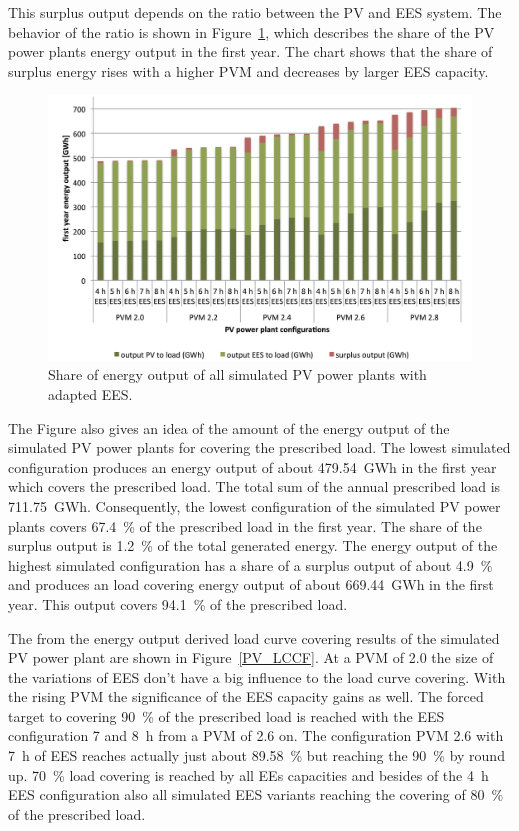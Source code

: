 This surplus output depends on the ratio between the PV and EES system. The behavior of the ratio is shown in Figure~\ref{PV_energy_output}, which describes the share of the PV power plants energy output in the first year. The chart shows that the share of surplus energy rises with a higher PVM and decreases by larger EES capacity.

\begin{figure}[htbp]  
\centering
\includegraphics[width=1\linewidth]{FIG/PV_energy_output}
\caption[Share of energy output of all simulated PV power plants with adapted EES.]{Share of energy output of all simulated PV power plants with adapted EES.}\label{PV_energy_output}
\end{figure}
The Figure also gives an idea of the amount of the energy output of the simulated PV power plants for covering the prescribed load. The lowest simulated configuration produces an energy output of about 479.54~GWh in the first year which covers the prescribed load. The total sum of the annual prescribed load is 711.75~GWh. Consequently, the lowest configuration of the simulated PV power plants covers 67.4~\% of the prescribed load in the first year. The share of the surplus output is 1.2~\% of the total generated energy. The energy output of the highest simulated configuration has a share of a surplus output of about 4.9~\% and produces an load covering energy output of about 669.44~GWh in the first year. This output covers 94.1~\% of the prescribed load.

The from the energy output derived load curve covering results of the simulated PV power plant are shown in Figure~\ref{PV_LCCF}. At a PVM of 2.0 the size of the variations of EES don't have a big influence to the load curve covering. With the rising PVM the significance of the EES capacity gains as well. The forced target to covering 90~\% of the prescribed load is reached with the EES configuration 7 and 8~h from a PVM of 2.6 on. The configuration PVM 2.6 with 7~h of EES reaches actually just about 89.58~\% but reaching the 90~\% by round up. 70~\% load covering is reached by all EEs capacities and besides of the 4~h EES configuration also all simulated EES variants reaching the covering of 80~\% of the prescribed load. 

